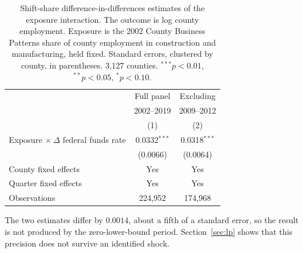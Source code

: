 \begin{table}[htbp]
\centering
\caption{Shift-share difference-in-differences estimates of the exposure interaction. The outcome is log county employment. Exposure is the 2002 County Business Patterns share of county employment in construction and manufacturing, held fixed. Standard errors, clustered by county, in parentheses. 3,127 counties. $^{***}p<0.01$, $^{**}p<0.05$, $^{*}p<0.10$.}
\label{tab:main}
\begin{tabular}{lcc}
\toprule
 & Full panel & Excluding \\
 & 2002--2019 & 2009--2012 \\
 & (1) & (2) \\
\midrule
Exposure $\times\ \Delta$ federal funds rate & 0.0332$^{***}$ & 0.0318$^{***}$ \\
 & (0.0066) & (0.0064) \\
\midrule
County fixed effects & Yes & Yes \\
Quarter fixed effects & Yes & Yes \\
Observations & 224,952 & 174,968 \\
\bottomrule
\end{tabular}

\begin{minipage}{0.92\textwidth}\vspace{4pt}\footnotesize The two estimates differ by $0.0014$, about a fifth of a standard error, so the result is not produced by the zero-lower-bound period. Section~\ref{sec:lp} shows that this precision does not survive an identified shock.\end{minipage}
\end{table}

